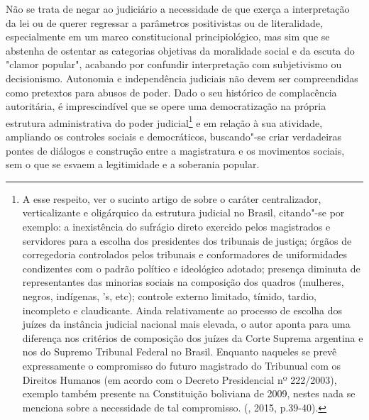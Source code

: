 Não se trata de negar ao judiciário a necessidade de que exerça a
interpretação da lei ou de querer regressar a parâmetros positivistas ou
de literalidade, especialmente em um marco constitucional
principiológico, mas sim que se abstenha de ostentar as categorias
objetivas da moralidade social e da escuta do "clamor popular", acabando
por confundir interpretação com subjetivismo ou decisionismo. Autonomia
e independência judiciais não devem ser compreendidas como pretextos
para abusos de poder. Dado o seu histórico de complacência autoritária,
é imprescindível que se opere uma democratização na própria estrutura
administrativa do poder judicial\footnote{A esse respeito, ver o sucinto
  artigo de  sobre o caráter centralizador, verticalizante
  e oligárquico da estrutura judicial no Brasil, citando"-se por exemplo:
  a inexistência do sufrágio direto exercido pelos magistrados e
  servidores para a escolha dos presidentes dos tribunais de justiça;
  órgãos de corregedoria controlados pelos tribunais e conformadores de
  uniformidades condizentes com o padrão político e ideológico adotado;
  presença diminuta de representantes das minorias sociais na composição
  dos quadros (mulheres, negros, indígenas, 's, etc); controle
  externo limitado, tímido, tardio, incompleto e claudicante. Ainda
  relativamente ao processo de escolha dos juízes da instância judicial
  nacional mais elevada, o autor aponta para uma diferença nos critérios
  de composição dos juízes da Corte Suprema argentina e nos do Supremo
  Tribunal Federal no Brasil. Enquanto naqueles se prevê expressamente o
  compromisso do futuro magistrado do Tribunual com os Direitos Humanos
  (em acordo com o Decreto Presidencial nº 222/2003), exemplo também
  presente na Constituição boliviana de 2009, nestes nada se menciona
  sobre a necessidade de tal compromisso. (, 2015,
  p.39-40).} e em relação à sua atividade, ampliando os controles
sociais e democráticos, buscando"-se criar verdadeiras pontes de diálogos
e construção entre a magistratura e os movimentos sociais, sem o que se
esvaem a legitimidade e a soberania popular.

